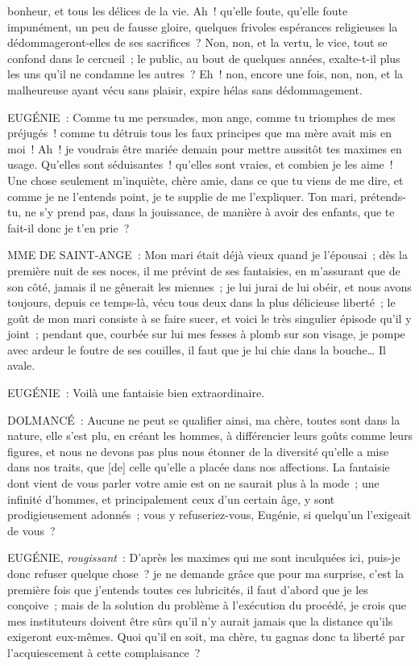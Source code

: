 \documentclass[french,twoside]{book} %
\begin{document}
bonheur, et tous les délices de la vie. Ah ! qu’elle foute, qu’elle foute impunément, un peu de fausse gloire, quelques frivoles espérances religieuses la dédommageront-elles de ses sacrifices ? Non, non, et la vertu, le vice, tout se confond dans le cercueil ; le public, au bout de quelques années, exalte-t-il plus les uns qu’il ne condamne les autres ? Eh ! non, encore une fois, non, non, et la malheureuse ayant vécu sans plaisir, expire hélas sans dédommagement.\par
EUGÉNIE : Comme tu me persuades, mon ange, comme tu triomphes de mes préjugés ! comme tu détruis tous les faux principes que ma mère avait mis en moi ! Ah ! je voudrais être mariée demain pour mettre aussitôt tes maximes en usage. Qu’elles sont séduisantes ! qu’elles sont vraies, et combien je les aime ! Une chose seulement m’inquiète, chère amie, dans ce que tu viens de me dire, et comme je ne l’entends point, je te supplie de me l’expliquer. Ton mari, prétends-tu, ne s’y prend pas, dans la jouissance, de manière à avoir des enfants, que te fait-il donc je t’en prie ?\par
MME DE SAINT-ANGE : Mon mari était déjà vieux quand je l’épousai ; dès la première nuit de ses noces, il me prévint de ses fantaisies, en m’assurant que de son côté, jamais il ne gênerait les miennes ; je lui jurai de lui obéir, et nous avons toujours, depuis ce temps-là, vécu tous deux dans la plus délicieuse liberté ; le goût de mon mari consiste à se faire sucer, et voici le très singulier épisode qu’il y joint ; pendant que, courbée sur lui mes fesses à plomb sur son visage, je pompe avec ardeur le foutre de ses couilles, il faut que je lui chie dans la bouche… Il avale.\par
EUGÉNIE : Voilà une fantaisie bien extraordinaire.\par
DOLMANCÉ : Aucune ne peut se qualifier ainsi, ma chère, toutes sont dans la nature, elle s’est plu, en créant les hommes, à différencier leurs goûts comme leurs figures, et nous ne devons pas plus nous étonner de la diversité qu’elle a mise dans nos traits, que [de] celle qu’elle a placée dans nos affections. La fantaisie dont vient de vous parler votre amie est on ne saurait plus à la mode ; une infinité d’hommes, et principalement ceux d’un certain âge, y sont prodigieusement adonnés ; vous y refuseriez-vous, Eugénie, si quelqu’un l’exigeait de vous ?\par
EUGÉNIE, {\itshape rougissant} : D’après les maximes qui me sont inculquées ici, puis-je donc refuser quelque chose ? je ne demande grâce que pour ma surprise, c’est la première fois que j’entends toutes ces lubricités, il faut d’abord que je les conçoive ; mais de la solution du problème à l’exécution du procédé, je crois que mes instituteurs doivent être sûrs qu’il n’y aurait jamais que la distance qu’ils exigeront eux-mêmes. Quoi qu’il en soit, ma chère, tu gagnas donc ta liberté par l’acquiescement à cette complaisance ?\par
\end{document}
